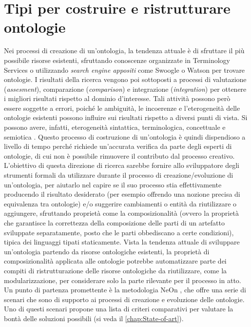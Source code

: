 \section{Tipi per costruire e ristrutturare ontologie}
Nei processi di creazione di un'ontologia, la tendenza attuale è di sfruttare il più possibile risorse esistenti, sfruttando conoscenze organizzate in 
Terminology Services \cite{ledl2016describing,vandenbussche2017linked} o utilizzando \emph{search engine appositi} come 
Swoogle \cite{swoogle} o Watson \cite{watson} per trovare ontologie. I risultati della ricerca vengono poi sottoposti a processi di valutazione 
(\emph{assesment}), comparazione (\emph{comparison}) e integrazione (\emph{integration}) per ottenere i migliori risultati rispetto al dominio d'interesse. Tali attività possono però essere soggette a errori, poiché le ambiguità, le incoerenze e l'eterogeneità delle ontologie esistenti 
possono influire sui risultati rispetto a diversi punti di vista. Si possono avere, infatti, eterogeneità sintattica, terminologica, concettuale e semiotica \cite{carriero2020OntoReuse}. Questo processo di costruzione di un'ontologia è quindi dispendioso a livello di tempo perché richiede un'accurata verifica da parte degli esperti di ontologie, di cui non è possibile rimuovere il contributo dal processo creativo. L'obiettivo di questa direzione di ricerca sarebbe fornire allo sviluppatore degli strumenti formali da utilizzare durante il processo di creazione/evoluzione di un'ontologia, per aiutarlo nel capire se il suo processo stia effettivamente producendo il risultato desiderato (per esempio offrendo una nozione precisa di equivalenza tra ontologie) e/o suggerire cambiamenti o entità da riutilizzare o aggiungere, sfruttando proprietà come la composizionalità (ovvero la proprietà che garantisce la correttezza della composizione delle parti di un artefatto sviluppate separatamente, posto che le parti obbediscano a certe condizioni), tipica dei linguaggi tipati staticamente. Vista la tendenza attuale di sviluppare un'ontologia partendo da risorse ontologiche esistenti, la proprietà di composizionalità applicata alle ontologie potrebbe automatizzare parte dei compiti di ristrutturazione delle risorse ontologiche da riutilizzare, come la modularizzazione, per considerare solo la parte rilevante per il processo in atto. Un punto di partenza promettente è la metodologia NeOn \cite{NeOn}, che offre una serie di scenari che sono di supporto ai processi di creazione e evoluzione delle ontologie. Uno di questi scenari propone una lista di criteri comparativi per valutare la bontà delle soluzioni possibili (si veda il \autoref{chap:State-of-art}).


